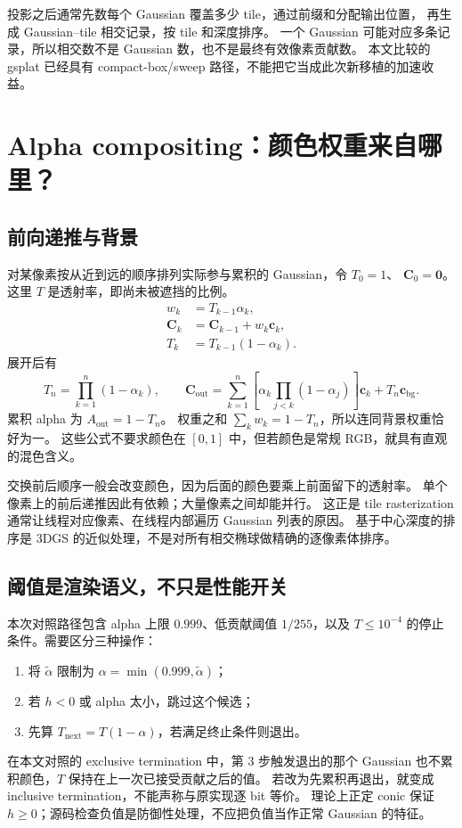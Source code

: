 投影之后通常先数每个 Gaussian 覆盖多少 tile，通过前缀和分配输出位置，
再生成 Gaussian--tile 相交记录，按 tile 和深度排序。
一个 Gaussian 可能对应多条记录，所以相交数不是 Gaussian 数，也不是最终有效像素贡献数。
本文比较的 gsplat 已经具有 compact-box/sweep 路径，不能把它当成此次新移植的加速收益。

\section{Alpha compositing：颜色权重来自哪里？}

\subsection{前向递推与背景}

对某像素按从近到远的顺序排列实际参与累积的 Gaussian，令 $T_0=1$、
$\mathbf C_0=\mathbf0$。这里 $T$ 是透射率，即尚未被遮挡的比例。
\begin{align}
 w_k&=T_{k-1}\alpha_k,\\
 \mathbf C_k&=\mathbf C_{k-1}+w_k\mathbf c_k,\\
 T_k&=T_{k-1}(1-\alpha_k).
\end{align}
展开后有
\begin{equation}
 T_n=\prod_{k=1}^n(1-\alpha_k),\qquad
 \mathbf C_{\mathrm{out}}=
 \sum_{k=1}^n\left[\alpha_k\prod_{j<k}(1-\alpha_j)\right]\mathbf c_k
 +T_n\mathbf c_{\mathrm{bg}}.
\end{equation}
累积 alpha 为 $A_{\mathrm{out}}=1-T_n$。
权重之和 $\sum_k w_k=1-T_n$，所以连同背景权重恰好为一。
这些公式不要求颜色在 $[0,1]$ 中，但若颜色是常规 RGB，就具有直观的混色含义。

交换前后顺序一般会改变颜色，因为后面的颜色要乘上前面留下的透射率。
单个像素上的前后递推因此有依赖；大量像素之间却能并行。
这正是 tile rasterization 通常让线程对应像素、在线程内部遍历 Gaussian 列表的原因。
基于中心深度的排序是 3DGS 的近似处理，不是对所有相交椭球做精确的逐像素体排序。

\subsection{阈值是渲染语义，不只是性能开关}

本次对照路径包含 alpha 上限 $0.999$、低贡献阈值 $1/255$，以及
$T\leq10^{-4}$ 的停止条件。需要区分三种操作：
\begin{enumerate}
 \item 将 $\widetilde\alpha$ 限制为 $\alpha=\min(0.999,\widetilde\alpha)$；
 \item 若 $h<0$ 或 alpha 太小，跳过这个候选；
 \item 先算 $T_{\mathrm{next}}=T(1-\alpha)$，若满足终止条件则退出。
\end{enumerate}
在本文对照的 exclusive termination 中，第 3 步触发退出的那个 Gaussian
也不累积颜色，$T$ 保持在上一次已接受贡献之后的值。
若改为先累积再退出，就变成 inclusive termination，不能声称与原实现逐 bit 等价。
理论上正定 conic 保证 $h\geq0$；源码检查负值是防御性处理，不应把负值当作正常 Gaussian 的特征。

